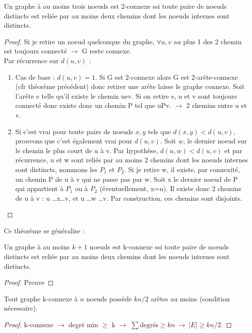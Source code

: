 \begin{mytheo} 
  Un graphe à au moins trois noeuds est 2-connexe ssi toute paire de noeuds distincts est reliée par au moins deux chemins dont les noeuds internes sont distincts.
  \begin{proof}
   \fbox{$\Longleftarrow$}
   \newline
   Si je retire un noeud quelconque du graphe, $\forall u,v$ au plus 1 des 2 chemin est toujours connecté $\rightarrow$ G reste connexe. \\
   \fbox{$\Longrightarrow$}
     \newline
     Par récurrence sur $d(u,v)$ : 
     \begin{enumerate}
     \item Cas de base : $d(u,v)=1$. Si G est 2-connexe alors G est 2-arête-connexe (cfr théorème précédent) donc retirer une arête laisse le graphe connexe. Soit l'arête e telle qu'il existe le chemin uev. Si on retire e, u et v sont toujours connecté donc existe donc un chemin P tel que uPv. $\rightarrow$ 2 chemins entre u et v.
     \item Si c'est vrai pour toute paire de noeuds $x,y$ tels que $d(x,y) < d(u,v)$, prouvons que c'est également vrai pour $d(u,v)$. Soit $w$, le dernier noeud sur le chemin le plus court de u à v. Par hypothèse, $d(u,w) < d(u,v)$ et par récurrence, u et w sont reliés par au moins 2 chemins dont les noeuds internes sont distincts, nommons les $P_1$ et $P_2$. Si je retire w, il existe, par connexité, un chemin P de u à v qui ne passe pas par w. Soit x le dernier noeud de P qui appartient à $P_1$ ou à $P_2$ (éventuellement, x=u). Il existe donc 2 chemins de u à v : u \dots x\dots v, et u \dots w \dots v. Par construction, ces chemins sont disjoints. 
     \end{enumerate}
  \end{proof}
\end{mytheo}

Ce théorème se généralise :

\begin{mytheo} 
  Un graphe à au moins $k + 1$ noeuds est k-connexe ssi toute paire de noeuds distincts est reliée par au moins deux chemins dont les noeuds internes sont distincts.
  \begin{proof}
     Preuve \addTODO
  \end{proof}
\end{mytheo}

\begin{mytheo} 
  Tout graphe k-connexe à $n$ noeuds possède $kn/2$ arêtes au moins (condition nécessaire).
  \begin{proof}
     k-connexe $\rightarrow$ degré min $\geq$ k $\rightarrow$ $\sum \text{degrés} \geq kn \ \rightarrow \ |E| \geq kn/2$.
  \end{proof}
\end{mytheo}

